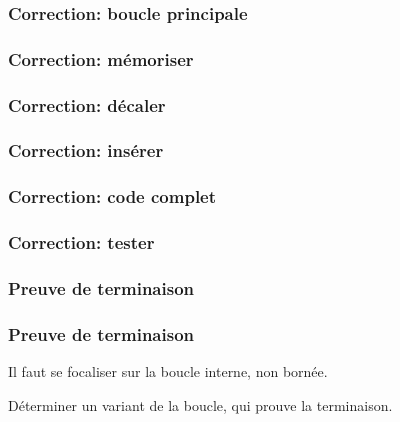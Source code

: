 \documentclass[svgnames,11pt]{beamer}
\begin{document}
\begin{frame}
    \frametitle{Correction: boucle principale}

    

\end{frame}
\begin{frame}
    \frametitle{Correction: mémoriser}

    

\end{frame}

\begin{frame}
    \frametitle{Correction: décaler}

    

\end{frame} 
\begin{frame}
    \frametitle{Correction: insérer}

    

\end{frame}

\begin{frame}
    \frametitle{Correction: code complet}

    

\end{frame}
\begin{frame}
    \frametitle{Correction: tester}

    

\end{frame}
\subsubsection{Preuve de terminaison}
\begin{frame}
    \frametitle{Preuve de terminaison}

    Il faut se focaliser sur la boucle interne, non bornée.
    \begin{activite}
        Déterminer un variant de la boucle, qui prouve la terminaison.
    \end{activite}

\end{frame}
\end{document}
